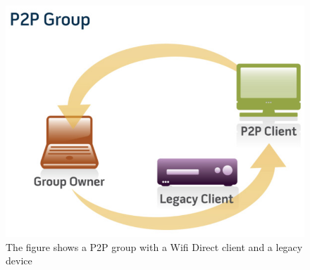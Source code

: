 \begin{figure}[!hb]
	\centering
  \includegraphics[width=0.8\linewidth]{images/wifidirect.eps}
	\caption{The figure shows a P2P group with a Wifi Direct client and a legacy device}
	\label{fig1}
\end{figure}